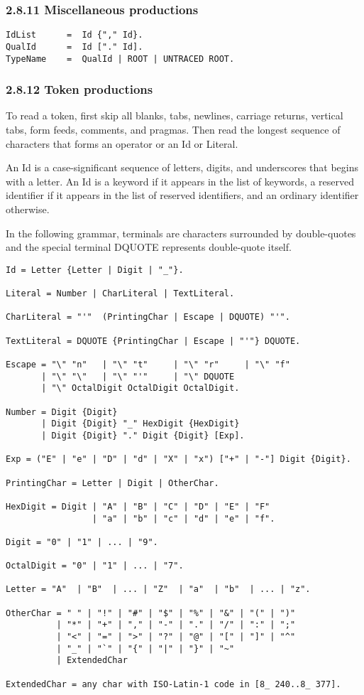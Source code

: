 \documentclass[10pt]{article}
\begin{document}
\subsubsection*{2.8.11 Miscellaneous productions}

\begin{verbatim}
IdList      =  Id {"," Id}.
QualId      =  Id ["." Id].
TypeName    =  QualId | ROOT | UNTRACED ROOT.
\end{verbatim}

\subsubsection*{2.8.12 Token productions}

To read a token, first skip all blanks, tabs, newlines, carriage returns,
vertical tabs, form feeds, comments, and pragmas.  Then read the longest
sequence of characters that forms an operator or an Id or Literal.

An Id is a case-significant sequence of letters, digits, and underscores that
begins with a letter.  An Id is a keyword if it appears in the list of
keywords, a reserved identifier if it appears in the list of reserved
identifiers, and an ordinary identifier otherwise.

In the following grammar, terminals are characters surrounded by double-quotes
and the special terminal DQUOTE represents double-quote itself.

\begin{verbatim}
Id = Letter {Letter | Digit | "_"}.

Literal = Number | CharLiteral | TextLiteral.

CharLiteral = "'"  (PrintingChar | Escape | DQUOTE) "'".

TextLiteral = DQUOTE {PrintingChar | Escape | "'"} DQUOTE.

Escape = "\" "n"   | "\" "t"     | "\" "r"     | "\" "f"
       | "\" "\"   | "\" "'"     | "\" DQUOTE
       | "\" OctalDigit OctalDigit OctalDigit.

Number = Digit {Digit}
       | Digit {Digit} "_" HexDigit {HexDigit}
       | Digit {Digit} "." Digit {Digit} [Exp].

Exp = ("E" | "e" | "D" | "d" | "X" | "x") ["+" | "-"] Digit {Digit}.

PrintingChar = Letter | Digit | OtherChar.

HexDigit = Digit | "A" | "B" | "C" | "D" | "E" | "F"
                 | "a" | "b" | "c" | "d" | "e" | "f".

Digit = "0" | "1" | ... | "9".

OctalDigit = "0" | "1" | ... | "7".

Letter = "A"  | "B"  | ... | "Z"  | "a"  | "b"  | ... | "z".

OtherChar = " " | "!" | "#" | "$" | "%" | "&" | "(" | ")"
          | "*" | "+" | "," | "-" | "." | "/" | ":" | ";"
          | "<" | "=" | ">" | "?" | "@" | "[" | "]" | "^"
          | "_" | "`" | "{" | "|" | "}" | "~"
          | ExtendedChar

ExtendedChar = any char with ISO-Latin-1 code in [8_ 240..8_ 377].
\end{verbatim}
\end{document}
